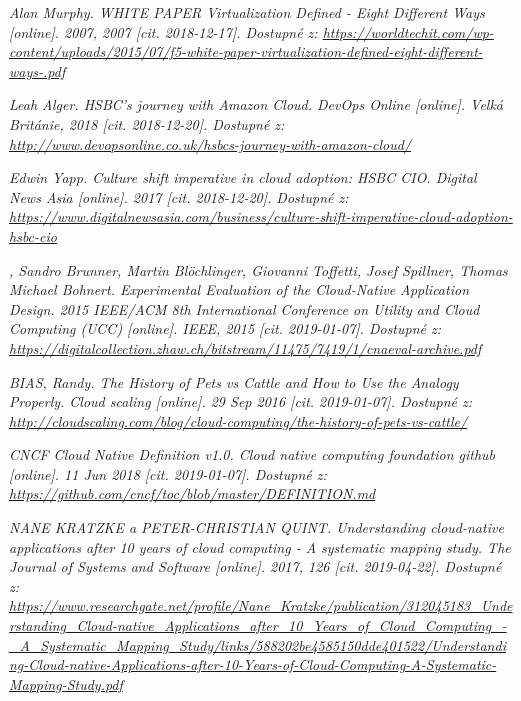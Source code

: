 \begin{thebibliography}{10}
	\emph{Alan Murphy. WHITE PAPER Virtualization Defined - Eight Different Ways [online]. 2007, 2007 [cit. 2018-12-17]. Dostupné z: \url{https://worldtechit.com/wp-content/uploads/2015/07/f5-white-paper-virtualization-defined-eight-different-ways-.pdf}}


	\emph{Leah Alger. HSBC’s journey with Amazon Cloud. DevOps Online [online]. Velká Británie, 2018 [cit. 2018-12-20]. Dostupné z: \url{http://www.devopsonline.co.uk/hsbcs-journey-with-amazon-cloud/}}

	\emph{Edwin Yapp. Culture shift imperative in cloud adoption: HSBC CIO. Digital News Asia [online]. 2017 [cit. 2018-12-20]. Dostupné z: \url{https://www.digitalnewsasia.com/business/culture-shift-imperative-cloud-adoption-hsbc-cio}}


	\emph{, Sandro Brunner, Martin Blöchlinger, Giovanni Toffetti, Josef Spillner, Thomas Michael Bohnert. Experimental Evaluation of the Cloud-Native Application Design. 2015 IEEE/ACM 8th International Conference on Utility and Cloud Computing (UCC) [online]. IEEE, 2015 [cit. 2019-01-07]. Dostupné z: \url{https://digitalcollection.zhaw.ch/bitstream/11475/7419/1/cnaeval-archive.pdf}}

	\emph{BIAS, Randy. The History of Pets vs Cattle and How to Use the Analogy Properly. Cloud scaling [online]. 29 Sep 2016 [cit. 2019-01-07]. Dostupné z: \url{http://cloudscaling.com/blog/cloud-computing/the-history-of-pets-vs-cattle/}}

	\emph{CNCF Cloud Native Definition v1.0. Cloud native computing foundation github [online]. 11 Jun 2018 [cit. 2019-01-07]. Dostupné z: \url{https://github.com/cncf/toc/blob/master/DEFINITION.md}}

	\emph{NANE KRATZKE a PETER-CHRISTIAN QUINT. Understanding cloud-native applications after 10 years of cloud computing - A systematic mapping study. The Journal of Systems and Software [online]. 2017, 126 [cit. 2019-04-22]. Dostupné z: \url{https://www.researchgate.net/profile/Nane_Kratzke/publication/312045183_Understanding_Cloud-native_Applications_after_10_Years_of_Cloud_Computing_-_A_Systematic_Mapping_Study/links/588202be4585150dde401522/Understanding-Cloud-native-Applications-after-10-Years-of-Cloud-Computing-A-Systematic-Mapping-Study.pdf}}



\end{thebibliography}
